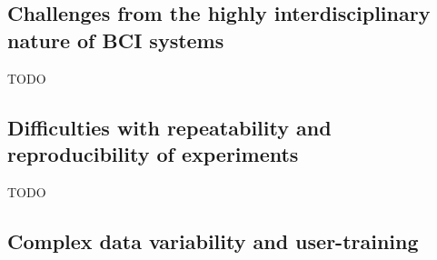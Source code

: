 
\subsection{Challenges from the highly interdisciplinary nature of BCI systems}
\label{subsec:bci_opportunities_obstacles_interdisciplinary}



TODO


\subsection{Difficulties with repeatability and reproducibility of experiments}
\label{subsec:bci_opportunities_obstacles_repeatability_reproducibility}


TODO


\subsection{Complex data variability and user-training}
\label{subsec:bci_opportunities_obstacles_training_and_variability}




